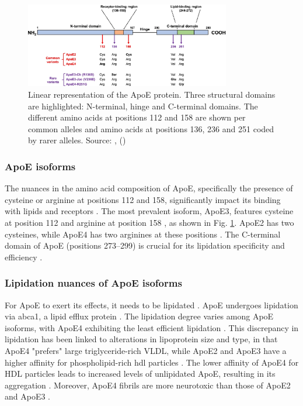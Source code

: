 \documentclass{amsart}
\begin{document}
\begin{figure}[htb]
  \includegraphics[width=0.8\textwidth]{figures/ApoEprot.png}
    \caption{Linear representation of the ApoE protein. Three structural domains are highlighted: N-terminal, hinge and C-terminal domains. The different amino acids at positions 112 and 158 are shown per common alleles and amino acids at positions 136, 236 and 251 coded by rarer alleles. Source: ,  (\citeyear{Bu2022APOEVariants}) \cite{Bu2022APOEVariants}}
  \label{fig2}
\end{figure}

\subsubsection{ApoE isoforms}
The nuances in the amino acid composition of ApoE, specifically the presence of cysteine or arginine at positions 112 and 158, significantly impact its binding with lipids and receptors \cite{Yassine2020APOEDisease}. The most prevalent isoform, ApoE3, features cysteine at position 112 and arginine at position 158  \cite{Yassine2020APOEDisease}, as shown in Fig. \ref{fig2}. ApoE2 has two cysteines, while ApoE4 has two arginines at these positions \cite{Yassine2020APOEDisease}. The C-terminal domain of ApoE (positions 273–299) is crucial for its lipidation specificity and efficiency \cite{Hu2015OpposingMice}.

\subsubsection{Lipidation nuances of ApoE isoforms}
For ApoE to exert its effects, it needs to be lipidated \cite{Husain2021APOETherapeutics}. ApoE undergoes lipidation via \acrfull{abca1}, a lipid efflux protein \cite{Flowers2020APOEBrain, Courtney2016LXRDisease}. The lipidation degree varies among ApoE isoforms, with ApoE4 exhibiting the least efficient lipidation \cite{Hu2015OpposingMice, Heinsinger2016ApolipoproteinFluid}. This discrepancy in lipidation has been linked to alterations in lipoprotein size and type, in that ApoE4 "prefers" large triglyceride-rich VLDL, while ApoE2 and ApoE3 have a higher affinity for phospholipid-rich \acrshort{hdl} particles \cite{Nguyen2010MolecularE4}. The lower affinity of ApoE4 for HDL particles leads to increased levels of unlipidated ApoE, resulting in its aggregation \cite{Hatters2006ApolipoproteinFunction}. Moreover, ApoE4 fibrils are more neurotoxic than those of ApoE2 and ApoE3 \cite{Hatters2006Amino-terminalFibrils}.
\end{document}
